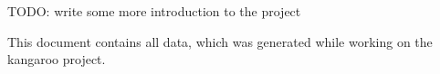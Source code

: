 TODO: write some more introduction to the project

This document contains all data, which was generated while
working on the kangaroo project.

